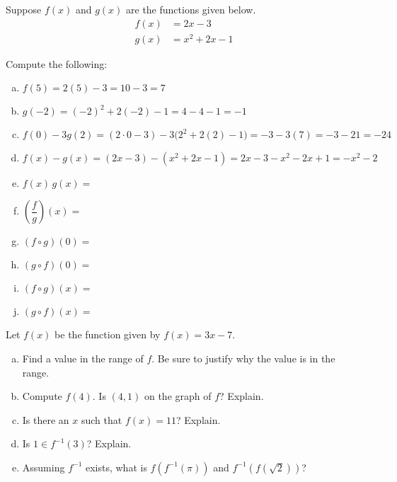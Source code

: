 \documentclass[11pt,letterpaper]{article}
\begin{document}
 Suppose $f(x)$ and $g(x)$ are the functions given below. 
	\[
	\begin{aligned}
	f(x)&= 2x - 3 \\[0.3cm]
	g(x)&= x^2 + 2x - 1
	\end{aligned}
	\]

Compute the following: \pspace
\begin{enumerate}[(a)]
\item $f(5)= 2(5) - 3= 10 - 3= 7$ \vfill
\item $g(-2)= (-2)^2 + 2(-2) - 1= 4 - 4 - 1= -1 $ \vfill
\item $f(0) - 3g(2)= (2 \cdot 0 - 3) - 3 \big( 2^2 + 2(2) - 1 \big)= -3 - 3(7)= -3 - 21= -24$ \vfill
\item $f(x) - g(x)= (2x - 3) - (x^2 + 2x - 1)= 2x - 3 - x^2 - 2x + 1= -x^2 - 2$ \vfill
\item $f(x) \, g(x)=$ \vfill
\item $\left( \dfrac{f}{g} \right)(x)=$ \vfill
\item $(f \circ g)(0)=$ \vfill
\item $(g \circ f)(0)=$ \vfill
\item $(f \circ g)(x)=$ \vfill
\item $(g \circ f)(x)=$ \vfill
\end{enumerate} 



\newpage



 Let $f(x)$ be the function given by $f(x)= 3x - 7$. 
	\begin{enumerate}[(a)]
	\item Find a value in the range of $f$. Be sure to justify why the value is in the range. 
	\item Compute $f(4)$. Is $(4, 1)$ on the graph of $f$? Explain. 
	\item Is there an $x$ such that $f(x)= 11$? Explain. 
	\item Is $1 \in f^{-1}(3)$? Explain. 
	\item Assuming $f^{-1}$ exists, what is $f(f^{-1}(\pi))$ and $f^{-1}(f(\sqrt{2}))$?
	\end{enumerate} \pspace
\end{document}
